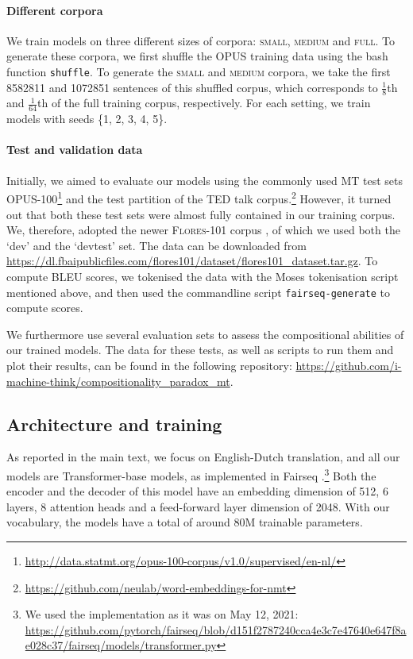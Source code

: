 \paragraph{Different corpora}
We train models on three different sizes of corpora: \textsc{small}, \textsc{medium} and \textsc{full}.
To generate these corpora, we first shuffle the OPUS training data using the bash function \texttt{shuffle}.
To generate the \textsc{small} and \textsc{medium} corpora, we take the first 8582811 and 1072851 sentences of this shuffled corpus, which corresponds to $\frac{1}{8}$th and $\frac{1}{64}$th of the full training corpus, respectively.
For each setting, we train models with seeds \{1, 2, 3, 4, 5\}.

\paragraph{Test and validation data}
Initially, we aimed to evaluate our models using the commonly used MT test sets OPUS-100\footnote{\url{http://data.statmt.org/opus-100-corpus/v1.0/supervised/en-nl/}} and the test partition of the TED talk corpus.\footnote{\url{https://github.com/neulab/word-embeddings-for-nmt}}
However, it turned out that both these test sets were almost fully contained in our training corpus.
We, therefore, adopted the newer \textsc{Flores-101} corpus \citep{goyal2021flores}, of which we used both the `dev' and the `devtest' set.
The data can be downloaded from \url{https://dl.fbaipublicfiles.com/flores101/dataset/flores101_dataset.tar.gz}.
To compute BLEU scores, we tokenised the data with the Moses tokenisation script mentioned above, and then used the commandline script \texttt{fairseq-generate} to compute scores.

We furthermore use several evaluation sets to assess the compositional abilities of our trained models.
The data for these tests, as well as scripts to run them and plot their results, can be found in the following repository: \url{https://github.com/i-machine-think/compositionality_paradox_mt}.

\subsection{Architecture and training} 
As reported in the main text, we focus on English-Dutch translation, and all our models are Transformer-base models, as implemented in Fairseq \citep{ott2019fairseq}.\footnote{We used the implementation as it was on May 12, 2021: \url{https://github.com/pytorch/fairseq/blob/d151f2787240cca4e3c7e47640e647f8ae028c37/fairseq/models/transformer.py}}
Both the encoder and the decoder of this model have an embedding dimension of 512, 6 layers, 8 attention heads and a feed-forward layer dimension of 2048.
With our vocabulary, the models have a total of around 80M trainable parameters.

